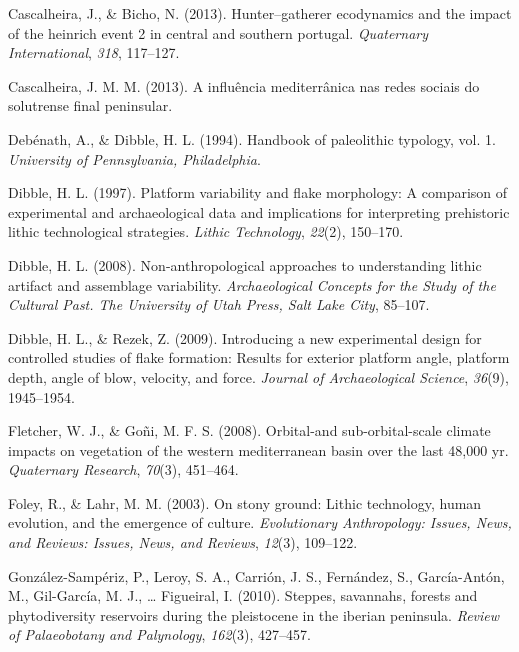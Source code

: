 \documentclass[12pt,twoside]{reedthesis}
\begin{document}
\leavevmode\hypertarget{ref-cascalheiraandbicho2013}{}%
Cascalheira, J., \& Bicho, N. (2013). Hunter--gatherer ecodynamics and the impact of the heinrich event 2 in central and southern portugal. \emph{Quaternary International}, \emph{318}, 117--127.

\leavevmode\hypertarget{ref-cascalheira2013}{}%
Cascalheira, J. M. M. (2013). A influência mediterrânica nas redes sociais do solutrense final peninsular.

\leavevmode\hypertarget{ref-debenath1994}{}%
Debénath, A., \& Dibble, H. L. (1994). Handbook of paleolithic typology, vol. 1. \emph{University of Pennsylvania, Philadelphia}.

\leavevmode\hypertarget{ref-dibble1997}{}%
Dibble, H. L. (1997). Platform variability and flake morphology: A comparison of experimental and archaeological data and implications for interpreting prehistoric lithic technological strategies. \emph{Lithic Technology}, \emph{22}(2), 150--170.

\leavevmode\hypertarget{ref-dibble2008}{}%
Dibble, H. L. (2008). Non-anthropological approaches to understanding lithic artifact and assemblage variability. \emph{Archaeological Concepts for the Study of the Cultural Past. The University of Utah Press, Salt Lake City}, 85--107.

\leavevmode\hypertarget{ref-dibble2009}{}%
Dibble, H. L., \& Rezek, Z. (2009). Introducing a new experimental design for controlled studies of flake formation: Results for exterior platform angle, platform depth, angle of blow, velocity, and force. \emph{Journal of Archaeological Science}, \emph{36}(9), 1945--1954.

\leavevmode\hypertarget{ref-fletcher2008}{}%
Fletcher, W. J., \& Goñi, M. F. S. (2008). Orbital-and sub-orbital-scale climate impacts on vegetation of the western mediterranean basin over the last 48,000 yr. \emph{Quaternary Research}, \emph{70}(3), 451--464.

\leavevmode\hypertarget{ref-foley2003}{}%
Foley, R., \& Lahr, M. M. (2003). On stony ground: Lithic technology, human evolution, and the emergence of culture. \emph{Evolutionary Anthropology: Issues, News, and Reviews: Issues, News, and Reviews}, \emph{12}(3), 109--122.

\leavevmode\hypertarget{ref-gonzalez-samperiz2010}{}%
González-Sampériz, P., Leroy, S. A., Carrión, J. S., Fernández, S., García-Antón, M., Gil-García, M. J., \ldots{} Figueiral, I. (2010). Steppes, savannahs, forests and phytodiversity reservoirs during the pleistocene in the iberian peninsula. \emph{Review of Palaeobotany and Palynology}, \emph{162}(3), 427--457.
\end{document}
